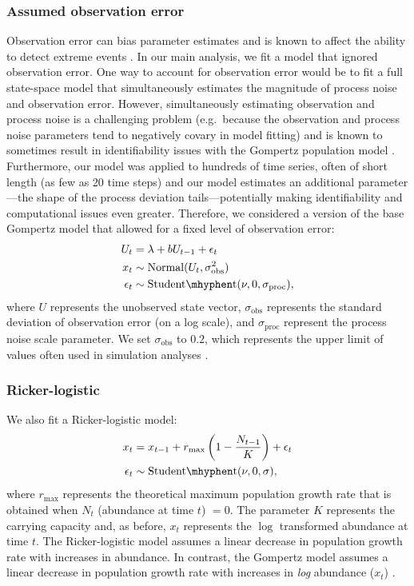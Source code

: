 \subsubsection{Assumed observation error}

Observation error can bias parameter estimates \citep[e.g.][]{knape2012} and
is known to affect the ability to detect extreme events \citep{ward2007}. In
our main analysis, we fit a model that ignored observation error. One way to
account for observation error would be to fit a full state-space model that
simultaneously estimates the magnitude of process noise and observation error.
However, simultaneously estimating observation and process noise is a
challenging problem (e.g.\ because the observation and process noise
parameters tend to negatively covary in model fitting) and is known to
sometimes result in identifiability issues with the Gompertz population model
\citep{knape2008}. Furthermore, our model was applied to hundreds of time
series, often of short length (as few as 20 time steps) and our model
estimates an additional parameter---the shape of the process deviation
tails---potentially making identifiability and computational issues even
greater. Therefore, we considered a version of the base Gompertz model that
allowed for a fixed level of observation error:
\begin{align*}
U_t &= \lambda + b U_{t-1} + \epsilon_t\\
x_t &\sim \mathrm{Normal}(U_t, \sigma_\mathrm{obs}^2)\\
\epsilon_t &\sim \mathrm{Student\mhyphen t}(\nu, 0, \sigma_\mathrm{proc}),
\end{align*}
where $U$ represents the unobserved state vector, $\sigma_\mathrm{obs}$
represents the standard deviation of observation error (on a log scale), and
$\sigma_\mathrm{proc}$ represent the process noise scale parameter. We set
$\sigma_\mathrm{obs}$ to $0.2$, which represents the upper limit of values
often used in simulation analyses \citep[e.g.][]{valpine2002, thorson2014b}.

\subsubsection{Ricker-logistic}

We also fit a Ricker-logistic model:
\begin{align*}
x_t &= x_{t-1} + r_{\mathrm{max}}\left(1 - \frac{N_{t-1}}{K}\right) + \epsilon_t\\
\epsilon_t &\sim \mathrm{Student\mhyphen t}(\nu, 0, \sigma),
\end{align*}
where $r_\mathrm{max}$ represents the theoretical maximum population growth
rate that is obtained when $N_t$ (abundance at time $t$) $= 0$. The parameter
$K$ represents the carrying capacity and, as before, $x_t$ represents the
$\log$ transformed abundance at time $t$. The Ricker-logistic model assumes a
linear decrease in population growth rate with increases in abundance. In
contrast, the Gompertz model assumes a linear decrease in population growth
rate with increases in \textit{log} abundance ($x_t$)
\citep[e.g.][]{thibaut2012}.

